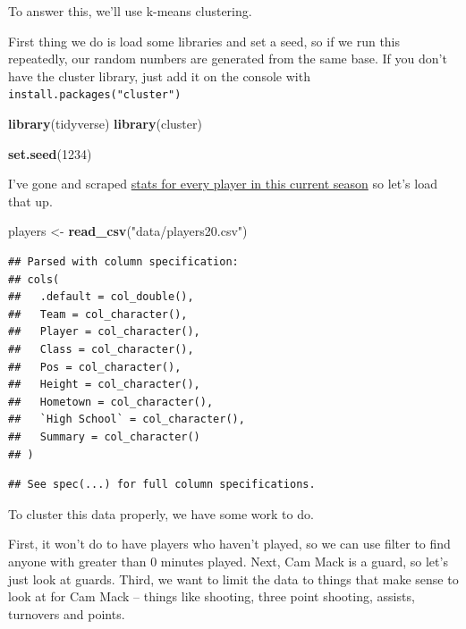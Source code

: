 \documentclass[]{book}
\newenvironment{Shaded}{\begin{snugshade}}{\end{snugshade}}
\newcommand{\DecValTok}[1]{\textcolor[rgb]{0.00,0.00,0.81}{#1}}
\newcommand{\KeywordTok}[1]{\textcolor[rgb]{0.13,0.29,0.53}{\textbf{#1}}}
\newcommand{\NormalTok}[1]{#1}
\newcommand{\StringTok}[1]{\textcolor[rgb]{0.31,0.60,0.02}{#1}}
\begin{document}
To answer this, we'll use k-means clustering.

First thing we do is load some libraries and set a seed, so if we run this repeatedly, our random numbers are generated from the same base. If you don't have the cluster library, just add it on the console with \texttt{install.packages("cluster")}

\begin{Shaded}
\begin{Highlighting}[]
\KeywordTok{library}\NormalTok{(tidyverse)}
\KeywordTok{library}\NormalTok{(cluster)}

\KeywordTok{set.seed}\NormalTok{(}\DecValTok{1234}\NormalTok{)}
\end{Highlighting}
\end{Shaded}

I've gone and scraped \href{https://unl.box.com/s/0g56ve61y6hakyxzr1u4t534721bqvg8}{stats for every player in this current season} so let's load that up.

\begin{Shaded}
\begin{Highlighting}[]
\NormalTok{players <-}\StringTok{ }\KeywordTok{read_csv}\NormalTok{(}\StringTok{"data/players20.csv"}\NormalTok{)}
\end{Highlighting}
\end{Shaded}

\begin{verbatim}
## Parsed with column specification:
## cols(
##   .default = col_double(),
##   Team = col_character(),
##   Player = col_character(),
##   Class = col_character(),
##   Pos = col_character(),
##   Height = col_character(),
##   Hometown = col_character(),
##   `High School` = col_character(),
##   Summary = col_character()
## )
\end{verbatim}

\begin{verbatim}
## See spec(...) for full column specifications.
\end{verbatim}

To cluster this data properly, we have some work to do.

First, it won't do to have players who haven't played, so we can use filter to find anyone with greater than 0 minutes played. Next, Cam Mack is a guard, so let's just look at guards. Third, we want to limit the data to things that make sense to look at for Cam Mack -- things like shooting, three point shooting, assists, turnovers and points.
\end{document}
